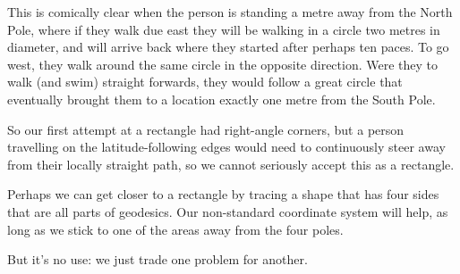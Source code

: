 This is comically clear when the person is standing a metre away from the North Pole, where if they walk due east they will be walking in a circle two metres in diameter, and will arrive back where they started after perhaps ten paces. To go west, they walk around the same circle in the opposite direction. Were they to walk (and swim) straight forwards, they would follow a great circle that eventually brought them to a location exactly one metre from the South Pole.

So our first attempt at a rectangle had right-angle corners, but a person travelling on the latitude-following edges would need to continuously steer away from their locally straight path, so we cannot seriously accept this as a rectangle.

Perhaps we can get closer to a rectangle by tracing a shape that has four sides that are all parts of geodesics. Our non-standard coordinate system will help, as long as we stick to one of the areas away from the four poles.

But it's no use: we just trade one problem for another.

